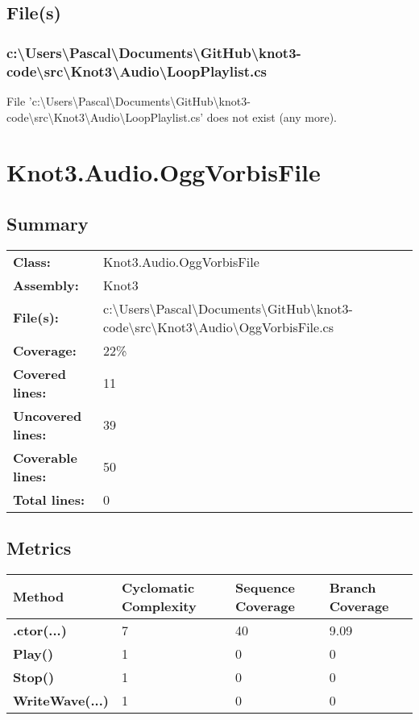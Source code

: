 \documentclass[a4paper,10pt]{article}
\begin{document}
\subsection{File(s)}
\subsubsection{c:\textbackslash Users\textbackslash Pascal\textbackslash Documents\textbackslash GitHub\textbackslash knot3-code\textbackslash src\textbackslash Knot3\textbackslash Audio\textbackslash LoopPlaylist.cs}
 File 'c:\textbackslash Users\textbackslash Pascal\textbackslash Documents\textbackslash GitHub\textbackslash knot3-code\textbackslash src\textbackslash Knot3\textbackslash Audio\textbackslash LoopPlaylist.cs' does not exist (any more).
\newpage
\section{Knot3.Audio.OggVorbisFile}
\subsection{Summary}
\begin{longtable}[l]{ll}
\textbf{Class:} & Knot3.Audio.OggVorbisFile\\
\textbf{Assembly:} & Knot3\\
\textbf{File(s):} & \begin{minipage}[t]{12cm}{c:\textbackslash Users\textbackslash Pascal\textbackslash Documents\textbackslash GitHub\textbackslash knot3-code\textbackslash src\textbackslash Knot3\textbackslash Audio\textbackslash OggVorbisFile.cs}\end{minipage} \\
\textbf{Coverage:} & 22\%\\
\textbf{Covered lines:} & 11\\
\textbf{Uncovered lines:} & 39\\
\textbf{Coverable lines:} & 50\\
\textbf{Total lines:} & 0\\
\end{longtable}
\subsection{Metrics}
\begin{longtable}[l]{|l|l|l|l|}
\hline
\textbf{Method} & \textbf{Cyclomatic Complexity} & \textbf{Sequence Coverage} & \textbf{Branch Coverage}\\
\hline
\textbf{.ctor(...)} & 7 & 40 & 9.09\\
\hline
\textbf{Play()} & 1 & 0 & 0\\
\hline
\textbf{Stop()} & 1 & 0 & 0\\
\hline
\textbf{WriteWave(...)} & 1 & 0 & 0\\
\hline
\end{longtable}
\end{document}
